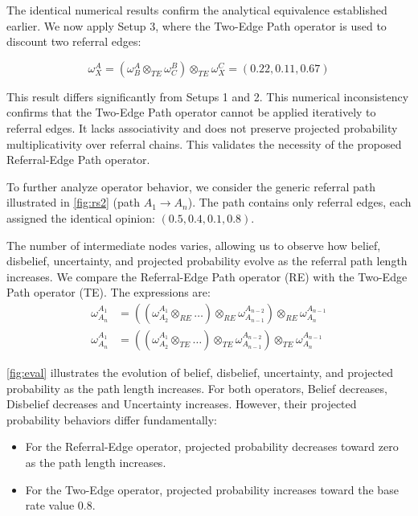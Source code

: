 The identical numerical results confirm the analytical equivalence established earlier. We now apply Setup 3, where the Two-Edge Path operator is used to discount two referral edges:

\[
\omega_X^A
=
(\omega_B^A \otimes_{TE} \omega_C^B) \otimes_{TE} \omega_X^C
=
(0.22, 0.11, 0.67)
\]

This result differs significantly from Setups 1 and 2.  This numerical inconsistency confirms that the Two-Edge Path operator cannot be applied iteratively to referral edges. It lacks associativity and does not preserve projected probability multiplicativity over referral chains. This validates the necessity of the proposed Referral-Edge Path operator.

To further analyze operator behavior, we consider the generic referral path illustrated in \cref{fig:rs2} (path $A_1 \to A_n$). The path contains only referral edges, each assigned the identical opinion:
\(
(0.5, 0.4, 0.1, 0.8)
\).

The number of intermediate nodes varies, allowing us to observe how belief, disbelief, uncertainty, and projected probability evolve as the referral path length increases. We compare the Referral-Edge Path operator (RE) with the Two-Edge Path operator (TE). The expressions are:
\begin{align}
\label{eq:RE_eval}
\omega^{A_1}_{A_n}
&=
((\omega^{A_1}_{A_2} \otimes_{RE} \dots )
\otimes_{RE}
\omega^{A_{n-2}}_{A_{n-1}})
\otimes_{RE}
\omega^{A_{n-1}}_{A_n} \\
\omega^{A_1}_{A_n}
&=
((\omega^{A_1}_{A_2} \otimes_{TE} \dots )
\otimes_{TE}
\omega^{A_{n-2}}_{A_{n-1}})
\otimes_{TE}
\omega^{A_{n-1}}_{A_n}
\end{align}

\cref{fig:eval} illustrates the evolution of belief, disbelief, uncertainty, and projected probability as the path length increases. For both operators, Belief decreases, Disbelief decreases and Uncertainty increases. However, their projected probability behaviors differ fundamentally:
\begin{itemize}
    \item For the Referral-Edge operator, projected probability decreases toward zero as the path length increases.
    \item For the Two-Edge operator, projected probability increases toward the base rate value $0.8$.
\end{itemize}

